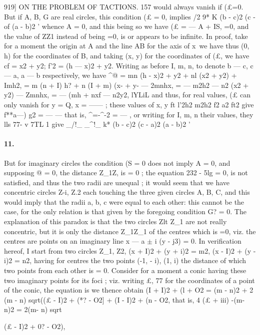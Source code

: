\documentclass[11pt,a4paper]{book}
\begin{document}
{{919]  ON    THE    PROBLEM    OF    TACTIONS.  157
would  always  vanish  if  (£=0.  But  if  A,  B,  G  are  real  circles,  this  condition  (£  =  0,
implies
/2  9*  K
(b  -  c)2     (c  -  of  (a  -  b)2  '
whence  A  =  0,  and  this  being  so  we  have  (£  =  ---  A  +  IS,  =0,  and  the  value  of  ZZ1
instead  of  being  =0,  is  or  appears  to  be  infinite.  In  proof,  take  for  a  moment  the
origin  at  A  and  the  line  AB  for  the  axis  of  x\  we  have  thus  (0,  h)  for  the  coordinates
of  B,  and  taking  (x,  y)  for  the  coordinates  of  (£,  we  have  cf  =  x2  +  y2;  f'2  =  (h  ---  x)2  +  y2.
Writing  as  before  I,  m,  n,  to  denote  b  ---  c,  c---  a,  a  ---  b  respectively,  we  have
^@  =     mn  {(h  -  x)2  +  y2}  +  nl  (x2  +  y2)  +  Imh2,
=      m  (n  +  I)  h?  +  n  (I  +  m)  (x-  +  y-  ---  2mnhx,
=  ---  m2h2  ---  n2  (x2  +  y2)  ---  Zmnhx,
=  ---  (mh  +  nxf  ---  n2y2,
lYLiL
and   thus,  for   real   values,  (£   can   only  vanish   for   y  =  Q,   x  =  ------  ;  these  values  of  x,  y
ft
l'2h2  m2h2  f2      a2      ft2
give   f**a---)  g2  =  ---  ---}   that   is,  ^=-^-2  =  ---  ,  or  writing  for  I,  m,  n  their  values,   they
lls  77-  v          7TL         1\>
give
\_/!\_    \_^!\_       k*
(b  -  c)2     (c  -  a)2     (a  -  b)2  '
\paragraph{11.} But  for  imaginary  circles  the  condition  (S  =  0  does  not  imply  A  =  0,
and  supposing  @  =  0,  the  distance  Z_1Z,  is  =  0  ;  the  equation  232  -  5lg  =  0,  is  not
satisfied,  and  thus  the  two  radii  are  unequal  ;  it  would  seem  that  we  have  concentric
circles  Z-i,  Z.2  each  touching  the  three  given  circles  A,  B,  C,  and  this  would  imply
that  the  radii  a,  b,  c  were  equal  to  each  other:  this  cannot  be  the  case,  for  the
only  relation  is  that  given  by  the  foregoing  condition  G?  =  0.  The  explanation  of  this
paradox  is  that  the  two  circles  Zlt  Z_1  are  not  really  concentric,  but  it  is  only  the
distance  Z_1Z_1  of  the  centres  which  is  =0,  viz.  the  centres  are  points  on  an  imaginary
line  x  ---  a  $\pm$  i  (y  -  j3)  =  0.
In  verification  hereof,  I  start  from  two  circles  Z_1,  Z2,
(x  +  I)2  +  (y  +  i)2  =  m2,
(x  -  I)2  +  (y  -  i)2  =  n2,
having  for  centres  the  two  points  (-1,  -  i),  (1,  i)  the  distance  of  which  two  points
from  each  other  is  =  0.  Consider  for  a  moment  a  conic  having  these  two  imaginary
points  for  its  foci  ;  viz.  writing  £,  77  for  the  coordinates  of  a  point  of  the  conic,  the
equation  is
we  thence  obtain
(I  +  I)2  +  (l  +  O2  =  (m  -  n)2  +  2  (m  -  n)  sqrt((£  -  I)2  +  (*?  -  O2]  +  (I  -  I)2  +  (n  -  O2,
that  is,
4  (£  +  iii)  -(m-  n)2  =  2(m-  n)  sqrt{(£  -  I)2  +  0?  -  O2),


}}
\end{document}
